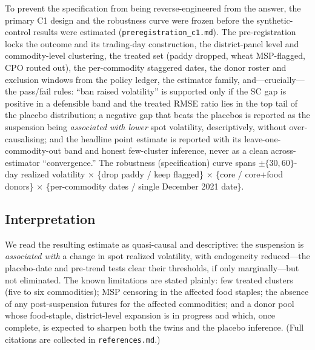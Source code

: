 To prevent the specification from being reverse-engineered from the answer, the primary C1
design and the robustness curve were frozen before the synthetic-control results were
estimated (\texttt{preregistration\_c1.md}). The pre-registration locks the outcome and its
trading-day construction, the district-panel level and commodity-level clustering, the treated
set (paddy dropped, wheat MSP-flagged, CPO routed out), the per-commodity staggered dates, the
donor roster and exclusion windows from the policy ledger, the estimator family, and---crucially---the
pass/fail rules: ``ban raised volatility'' is supported only if the SC gap is positive in a
defensible band and the treated RMSE ratio lies in the top tail of the placebo distribution; a
negative gap that beats the placebos is reported as the suspension being \emph{associated with
lower} spot volatility, descriptively, without over-causalising; and the headline point estimate
is reported with its leave-one-commodity-out band and honest few-cluster inference, never as a
clean across-estimator ``convergence.'' The robustness (specification)
curve spans $\pm\{30,60\}$-day realized volatility $\times$ \{drop paddy / keep flagged\}
$\times$ \{core / core+food donors\} $\times$ \{per-commodity dates / single December 2021 date\}.

\subsection{Interpretation}

We read the resulting estimate as quasi-causal and descriptive: the suspension is
\emph{associated with} a change in spot realized volatility, with endogeneity reduced---the
placebo-date and pre-trend tests clear their thresholds, if only marginally---but not eliminated. The known limitations are stated
plainly: few treated clusters (five to six commodities); MSP censoring in the affected food
staples; the absence of any post-suspension futures for the affected commodities; and a donor
pool whose food-staple, district-level expansion is in progress and which, once complete, is
expected to sharpen both the twins and the placebo inference. (Full citations are collected in
\texttt{references.md}.)
